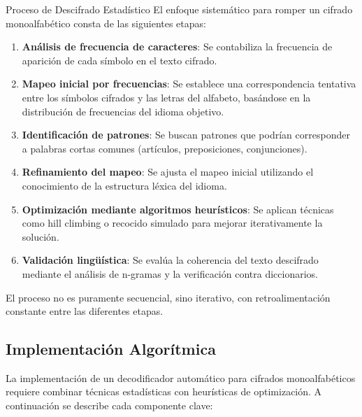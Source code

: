 \begin{cryptomethod}{Proceso de Descifrado Estadístico}
El enfoque sistemático para romper un cifrado monoalfabético consta de las siguientes etapas:

\begin{enumerate}
    \item \textbf{Análisis de frecuencia de caracteres}: Se contabiliza la frecuencia de aparición de cada símbolo en el texto cifrado.
    
    \item \textbf{Mapeo inicial por frecuencias}: Se establece una correspondencia tentativa entre los símbolos cifrados y las letras del alfabeto, basándose en la distribución de frecuencias del idioma objetivo.
    
    \item \textbf{Identificación de patrones}: Se buscan patrones que podrían corresponder a palabras cortas comunes (artículos, preposiciones, conjunciones).
    
    \item \textbf{Refinamiento del mapeo}: Se ajusta el mapeo inicial utilizando el conocimiento de la estructura léxica del idioma.
    
    \item \textbf{Optimización mediante algoritmos heurísticos}: Se aplican técnicas como hill climbing o recocido simulado para mejorar iterativamente la solución.
    
    \item \textbf{Validación lingüística}: Se evalúa la coherencia del texto descifrado mediante el análisis de n-gramas y la verificación contra diccionarios.
\end{enumerate}

El proceso no es puramente secuencial, sino iterativo, con retroalimentación constante entre las diferentes etapas.
\end{cryptomethod}

\subsection{Implementación Algorítmica}

La implementación de un decodificador automático para cifrados monoalfabéticos requiere combinar técnicas estadísticas con heurísticas de optimización. A continuación se describe cada componente clave:

